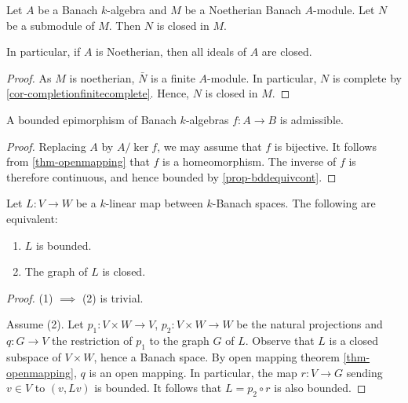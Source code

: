 \begin{corollary}\label{cor-idealclosed}
    Let $A$ be a Banach $k$-algebra and $M$ be a Noetherian Banach $A$-module. Let $N$ be a submodule of $M$. Then $N$ is closed in $M$.

    In particular, if $A$ is Noetherian, then all ideals of $A$ are closed.
\end{corollary}
\begin{proof}
    As $M$ is noetherian, $\bar{N}$ is a finite $A$-module. In particular, $N$ is complete by \cref{cor-completionfinitecomplete}. Hence, $N$ is closed in $M$.
\end{proof}

\begin{corollary}\label{cor-bddisadmi}
    A bounded epimorphism of Banach $k$-algebras $f:A\rightarrow B$ is admissible.
\end{corollary}
\begin{proof}
    Replacing $A$ by $A/\ker f$, we may assume that $f$ is bijective. It follows from \cref{thm-openmapping} that $f$ is a homeomorphism. The inverse of $f$ is therefore continuous, and hence bounded by \cref{prop-bddequivcont}.
\end{proof}


\begin{corollary}\label{cor-closedgraph}
    Let $L:V\rightarrow W$ be a $k$-linear map between $k$-Banach spaces. The following are equivalent:
    \begin{enumerate}
        \item $L$ is bounded.
        \item The graph of $L$ is closed.
    \end{enumerate}
\end{corollary}
\begin{proof}
    (1) $\implies$ (2) is trivial.

    Assume (2). Let $p_1:V\times W\rightarrow V$, $p_2:V\times W\rightarrow W$ be the natural projections and $q:G\rightarrow V$ the restriction of $p_1$ to the graph $G$ of $L$. Observe that $L$ is a closed subspace of $V\times W$, hence a Banach space. By open mapping theorem \cref{thm-openmapping}, $q$ is an open mapping. In particular, the map $r:V\rightarrow G$ sending $v\in V$ to $(v,Lv)$ is bounded. It follows that $L=p_2\circ r$ is also bounded.
\end{proof}

